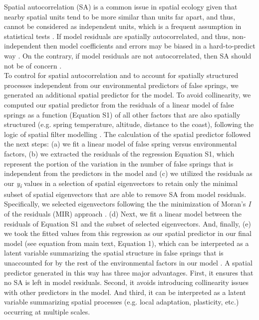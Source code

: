 \documentclass{article}\usepackage[]{graphicx}\usepackage[]{color}
\begin{document}
Spatial autocorrelation (SA) is a common issue in spatial ecology given that nearby spatial units tend to be more similar than units far apart, and thus, cannot be considered as independent units, which is a frequent assumption in statistical tests \citep{diniz2003spatial}. If model residuals are spatially autocorrelated, and thus, non-independent then model coefficients and errors may be biased in a hard-to-predict way \citep{mauricio2009coefficient}. On the contrary, if model residuals are not autocorrelated, then SA should not be of concern \citep{hawkins2012eight}.\\

To control for spatial autocorrelation and to account for spatially structured processes independent from our environmental predictors of false springs, we generated an additional spatial predictor for the model. To avoid collinearity, we computed our spatial predictor from the residuals of a linear model of false springs as a function (Equation S1) of all other factors that are also spatially structured (e.g. spring temperature, altitude, distance to the coast), following the logic of spatial filter modelling \citep{diniz2005modelling}. The calculation of the spatial predictor followed the next steps: (a) we fit a linear model of false spring versus environmental factors, (b) we extracted the residuals of the regression Equation S1, which represent the portion of the variation in the number of false springs that is independent from the predictors in the model and (c) we utilized the residuals as our \textit{y\textsubscript{i}} values in a selection of spatial eigenvectors to retain only the minimal subset of spatial eigenvectors that are able to remove SA from model residuals. Specifically, we selected eigenvectors following the the minimization of Moran's \textit{I} of the residuals (MIR) approach \citep{griffith2006spatial,diniz2012selection,Baumen2017}. (d) Next, we fit a linear model between the residuals of Equation S1 and the subset of selected eigenvectors. And, finally, (e) we took the fitted values from this regression as our spatial predictor in our final model (see equation from main text, Equation 1), which can be interpreted as a latent variable summarizing the spatial structure in false springs that is unaccounted for by the rest of the environmental factors in our model \citep{morales2012imprint}. A spatial predictor generated in this way has three major advantages. First, it ensures that no SA is left in model residuals. Second, it avoids introducing collinearity issues with other predictors in the model. And third, it can be interpreted as a latent variable summarizing spatial processes (e.g. local adaptation, plasticity, etc.) occurring at multiple scales.
\end{document}

